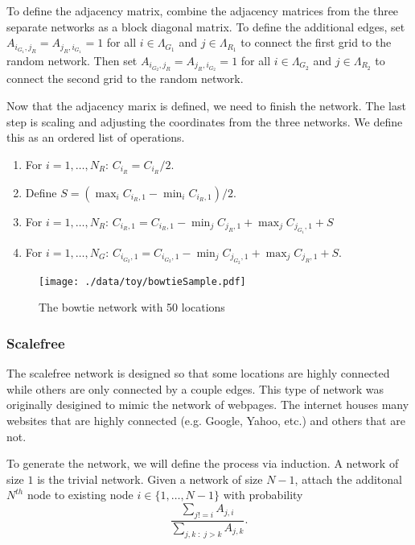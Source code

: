 \documentclass[11pt]{article}
\begin{document}
To define the adjacency matrix, combine the adjacency matrices from
the three separate networks as a block diagonal matrix.  To define the
additional edges, set $A_{i_{G_1},j_R} = A_{j_R,i_{G_1}} = 1$ for all
$i \in \Lambda_{G_1}$ and $j \in \Lambda_{R_1}$ to connect the first
grid to the random network.  Then set $A_{i_{G_2},j_R} =
A_{j_R,i_{G_2}} = 1$ for all $i \in \Lambda_{G_2}$ and $j \in
\Lambda_{R_2}$ to connect the second grid to the random network.

Now that the adjacency marix is defined, we need to finish the
network.  The last step is scaling and adjusting the coordinates from
the three networks.  We define this as an ordered list of operations.
\begin{enumerate}
  \item For $i=1,\ldots,N_R$: $C_{i_{R}} = C_{i_{R}}/2$.
  \item Define $S = (\max_i C_{i_{R},1} - \min_i C_{i_{R},1})/2$.
  \item For $i=1,\ldots,N_R$: $C_{i_{R},1} = C_{i_{R},1} -
  \min_j C_{j_{R},1} + \max_j C_{j_{G_1},1} + S$
  \item For $i=1,\ldots,N_G$:
  $C_{i_{G_2},1} = C_{i_{G_2},1} - \min_j C_{j_{G_2},1} + \max_j
  C_{j_{R},1} + S$.
\end{enumerate}


\begin{figure}[htb]
\centering
\texttt{[image: ./data/toy/bowtieSample.pdf]}
\caption{\label{fig:bowtie25}The bowtie network with 50 locations}
\end{figure}


\subsubsection{Scalefree}
\label{sec-3-1-6}

The scalefree network is designed so that some locations are highly
connected while others are only connected by a couple edges.  This
type of network was originally desigined to mimic the network of
webpages.  The internet houses many websites that are highly
connected (e.g. Google, Yahoo, etc.) and others that are not.

To generate the network, we will define the process via induction.  A
network of size $1$ is the trivial network.  Given a network of size
$N-1$, attach the additonal $N^{th}$ node to existing node $i \in
\lbrace 1,\ldots,N-1\rbrace$ with probability
\begin{equation*}
  \frac{\sum_{j!=i} A_{j,i}}{\sum_{j,k \;:\; j > k} A_{j,k}}.
\end{equation*}
\end{document}
